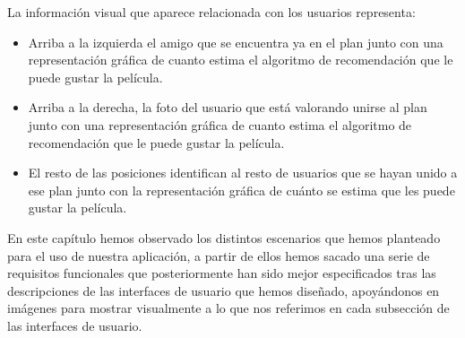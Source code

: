 \begin{flushleft}
La información visual que aparece relacionada con los usuarios representa:
\begin{itemize}
    \item Arriba a la izquierda el amigo que se encuentra ya en el plan junto con una representación gráfica 
    de cuanto estima el algoritmo de recomendación que le puede gustar la película.
    \item Arriba a la derecha, la foto del usuario que está valorando unirse al plan junto con una representación 
    gráfica de cuanto estima el algoritmo de recomendación que le puede gustar la película.
    \item El resto de las posiciones identifican al resto de usuarios que se hayan unido a ese plan junto con la representación gráfica de 
    cuánto se estima que les puede gustar la película.
\end{itemize}
\end{flushleft}

\begin{flushleft}
     En este capítulo hemos observado los distintos escenarios que hemos planteado para el uso de nuestra aplicación, a partir de ellos hemos sacado una serie de 
     requisitos funcionales que posteriormente han sido mejor especificados tras las descripciones de las interfaces de usuario que hemos diseñado, apoyándonos en imágenes 
     para mostrar visualmente a lo que nos referimos en cada subsección de las interfaces de usuario.
\end{flushleft}





